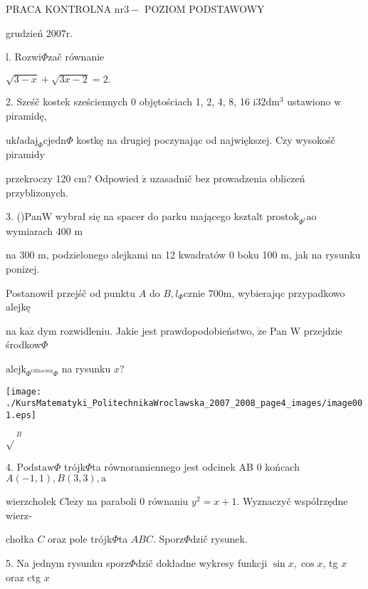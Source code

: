 \documentclass[a4paper,12pt]{article}
\begin{document}
PRACA KONTROLNA $\mathrm{n}\mathrm{r}3-$ POZIOM PODSTAWOWY

grudzień $2007\mathrm{r}.$

l. Rozwi$\Phi$zač równanie

$\sqrt{3-x}+\sqrt{3x-2}=2.$

2. Sześč kostek sześciennych $0$ objętościach 1, 2, 4, 8, 16 $\mathrm{i}32\mathrm{d}\mathrm{m}^{3}$ ustawiono $\mathrm{w}$ piramidę,

$\mathrm{u}\mathrm{k}l\mathrm{a}\mathrm{d}\mathrm{a}\mathrm{j}_{\Phi}\mathrm{c}\mathrm{j}\mathrm{e}\mathrm{d}\mathrm{n}\Phi$ kostkę na drugiej poczynając od największej. Czy wysokośč piramidy

przekroczy 120 cm? Odpowied $\acute{\mathrm{z}}$ uzasadnič bez prowadzenia obliczeń przyblizonych.

3. ()$\mathrm{P}\mathrm{a}\mathrm{n}\mathrm{W}$ wybrał się na spacer do parku mającego ksztalt $\mathrm{p}\mathrm{r}\mathrm{o}\mathrm{s}\mathrm{t}\mathrm{o}\mathrm{k}_{\Phi^{\mathrm{t}}}\mathrm{a}\mathrm{o}$ wymiarach 400 $\mathrm{m}$

na 300 $\mathrm{m}$, podzielonego alejkami na 12 kwadratów $0$ boku 100 $\mathrm{m}$, jak na rysunku ponizej.

Postanowił przejśč od punktu $A$ do $B, l_{\Phi}$cznie $700\mathrm{m}$, wybierajqc przypadkowo alejkę

na $\mathrm{k}\mathrm{a}\dot{\mathrm{z}}$ dym rozwidleniu. Jakie jest prawdopodobieństwo, $\dot{\mathrm{z}}\mathrm{e}$ Pan $\mathrm{W}$ przejdzie środkow$\Phi$

$\mathrm{a}\mathrm{l}\mathrm{e}\mathrm{j}\mathrm{k}_{\Phi^{\mathrm{O}\mathrm{Z}\mathrm{n}\mathrm{a}\mathrm{c}\mathrm{z}\mathrm{o}\mathrm{n}}\Phi}$ na rysunku $x$?
\begin{center}
\texttt{[image: ./KursMatematyki\_PolitechnikaWroclawska\_2007\_2008\_page4\_images/image001.eps]}
\end{center}
$\sqrt{}^{B}$

4. $\mathrm{P}\mathrm{o}\mathrm{d}\mathrm{s}\mathrm{t}\mathrm{a}\mathrm{w}\Phi$ trójk$\Phi$ta równoramiennego jest odcinek AB $0$ końcach $A(-1,1), B(3,3), \mathrm{a}$

wierzchołek $C\mathrm{l}\mathrm{e}\dot{\mathrm{z}}\mathrm{y}$ na paraboli $0$ równaniu $y^{2}=x+1$. Wyznaczyč współrzędne wierz-

chołka $C$ oraz pole trójk$\Phi$ta $ABC$. Sporz$\Phi$dzič rysunek.

5. Na jednym rysunku sporz$\Phi$dzič dokładne wykresy funkcji $\sin x, \cos x$, tg $x$ oraz ctg $x$
\end{document}
